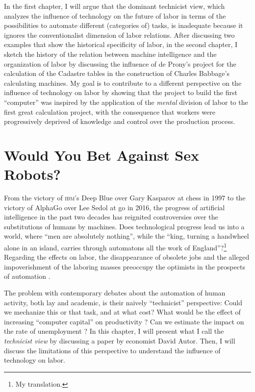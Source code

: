 \documentclass[version=last,draft=false,paper=A4,portrait,twoside=true,twocolumn=false,headinclude=false,footinclude=false,fontsize=12,BCOR=20mm,DIV=calc,pagesize=auto,titlepage=firstiscover,mpinclude=false,open=right,chapterprefix=true,numbers=autoendperiod,headsepline=false,headings=twolinechapter,parskip=false]{scrbook}
\begin{document}
In the first chapter, I will argue that the dominant technicist view, which
analyzes the influence of technology on the future of labor in terms of the
possibilities to automate different (categories of) tasks, is inadequate
because it ignores the conventionalist dimension of labor relations. After
discussing two examples that show the historical specificity of labor, in
the second chapter, I sketch the history of the relation between machine
intelligence and the organization of labor by discussing the influence of
de Prony's project for the calculation of the Cadastre tables in the
construction of Charles Babbage's calculating machines. My goal is to
contribute to a different perspective on the influence of technology on
labor by showing that the project to build the first ``computer'' was
inspired by the application of the \textit{mental} division of labor to the
first great calculation project, with the consequence that workers were
progressively deprived of knowledge and control over the production
process.


\mainmatter
\pagestyle{scrheadings}
\chapter{Would You Bet Against Sex Robots?}
\label{sec:org6ab0bfd}
From the victory of \textsc{ibm}'s Deep Blue over Gary Kasparov at chess in
1997 to the victory of AlphaGo over Lee Sedol at go in 2016, the progress
of artificial intelligence in the past two decades has reignited
controversies over the substitutions of humans by machines. Does
technological progress lead us into a world, where ``men are absolutely
nothing'', while the ``king, turning a handwheel alone in an island,
carries through automatons all the work of
England''\autocite[330]{sismondi1819_2}?\footnote{My translation.} Regarding the effects on
labor, the disappearance of obsolete jobs and the alleged impoverishment of
the laboring masses preoccupy the optimists in the prospects of automation
\autocite{ford2009}.

The problem with contemporary debates about the automation of human
activity, both lay and academic, is their naively ``technicist''
perspective: Could we mechanize this or that task, and at what cost? What
would be the effect of increasing ``computer capital'' on productivity
\autocite{frey_osborne2013}? Can we estimate the impact on the rate of
unemployment \autocite{acemoglu_restrepo2018}? In this chapter, I will
present what I call the \emph{technicist view} by discussing a paper by economist
David Autor. Then, I will discuss the limitations of this perspective to
understand the influence of technology on labor.
\end{document}
